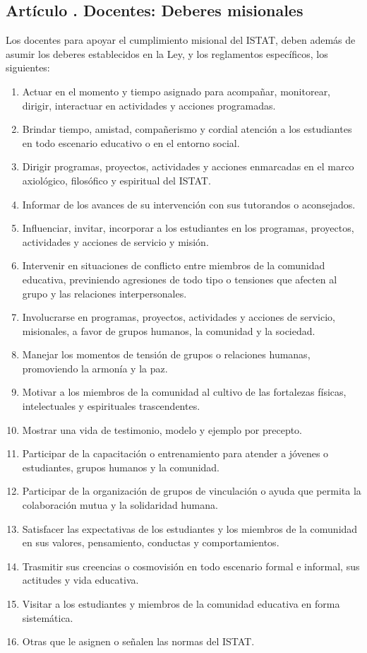 \subsection{Artículo . Docentes: Deberes misionales}
\addtocounter{ns}{1}
Los docentes para apoyar el cumplimiento misional del ISTAT, deben además de asumir los deberes establecidos en la Ley, y los reglamentos específicos, los siguientes: 
\begin{enumerate}
\item Actuar en el momento y tiempo asignado para acompañar, monitorear, dirigir, interactuar en actividades y acciones programadas. 
\item Brindar tiempo, amistad, compañerismo y cordial atención a los estudiantes en todo escenario educativo o en el entorno social. 
\item Dirigir programas, proyectos, actividades y acciones enmarcadas en el marco axiológico, filosófico y espiritual del ISTAT. 
\item Informar de los avances de su intervención con sus tutorandos o aconsejados. 
\item Influenciar, invitar, incorporar a los estudiantes en los programas, proyectos, actividades y acciones de servicio y misión. 
\item Intervenir en situaciones de conflicto entre miembros de la comunidad educativa, previniendo agresiones de todo tipo o tensiones que afecten al grupo y las relaciones interpersonales. 
\item Involucrarse en programas, proyectos, actividades y acciones de servicio, misionales, a favor de grupos humanos, la comunidad y la sociedad. 
\item Manejar los momentos de tensión de grupos o relaciones humanas, promoviendo la armonía y la paz. 
\item Motivar a los miembros de la comunidad al cultivo de las fortalezas físicas, intelectuales y espirituales trascendentes. 
\item Mostrar una vida de testimonio, modelo y ejemplo por precepto. 
\item Participar de la capacitación o entrenamiento para atender a jóvenes o estudiantes, grupos humanos y la comunidad. 
\item Participar de la organización de grupos de vinculación o ayuda que permita la colaboración mutua y la solidaridad humana. 
\item Satisfacer las expectativas de los estudiantes y los miembros de la comunidad en sus valores, pensamiento, conductas y comportamientos. 
\item Trasmitir sus creencias o cosmovisión en todo escenario formal e informal, sus actitudes y vida educativa. 
\item Visitar a los estudiantes y miembros de la comunidad educativa en forma sistemática. 
\item Otras que le asignen o señalen las normas del ISTAT. 
\end{enumerate}
